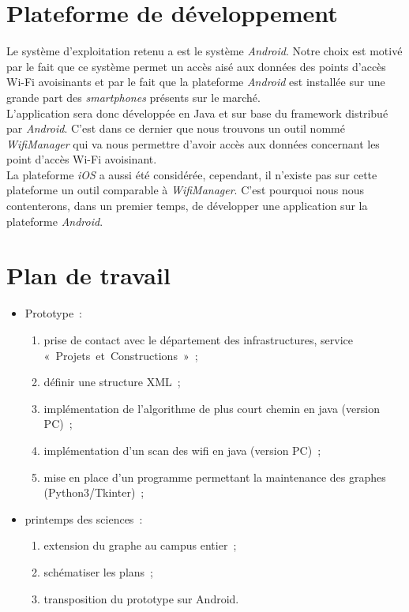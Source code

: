 \documentclass[a4paper,11pt]{article}
\begin{document}
\section{Plateforme de développement}
	Le système d'exploitation retenu a est le système \textit{Android}. Notre choix est motivé par le fait que ce système permet un accès aisé aux données des points d'accès Wi-Fi avoisinants et par le fait que la plateforme \textit{Android} est installée sur une grande part des \textit{smartphones} présents sur le marché.\\
	L'application sera donc développée en Java et sur base du framework distribué par \textit{Android}. C'est dans ce dernier que nous trouvons un outil nommé \textit{WifiManager} qui va nous permettre d'avoir accès aux données concernant les point d'accès Wi-Fi avoisinant.\\
	La plateforme \textit{iOS} a aussi été considérée, cependant, il n'existe pas sur cette plateforme un outil comparable à \textit{WifiManager}. C'est pourquoi nous nous contenterons, dans un premier temps, de développer une application sur la plateforme \textit{Android}.

\section{Plan de travail}
  \begin{itemize}
	\item Prototype~:
	  \begin{enumerate}
	    \item prise de contact avec le département des infrastructures, service «~Projets~et~Constructions~»~;
	    \item définir une structure XML~;
	    \item implémentation de l'algorithme de plus court chemin en java (version PC)~;
	    \item implémentation d'un scan des wifi en java (version PC)~;
	    \item mise en place d'un programme permettant la maintenance des graphes (Python3/Tkinter)~;
	  \end{enumerate}
	\item printemps des sciences~:
	  \begin{enumerate}
	    \item extension du graphe au campus entier~;
	    \item schématiser les plans~;
	    \item transposition du prototype sur Android.
	  \end{enumerate}
  \end{itemize}
  
\end{document}
